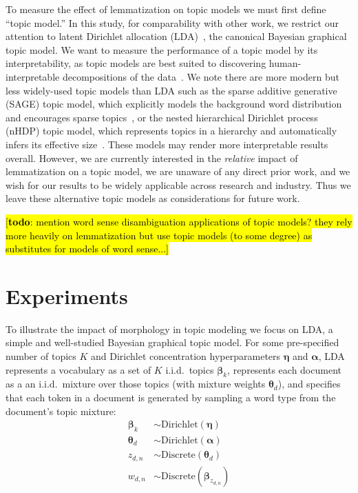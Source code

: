 \documentclass[11pt,letterpaper]{article}
\renewcommand{\vec}{\boldsymbol}   %
\newcommand{\valpha}{{\vec{\alpha}}}
\newcommand{\vtheta}{{\vec{\theta}}}
\newcommand{\veta}{{\vec{\eta}}}
\newcommand{\vbeta}{{\vec{\beta}}}
\newcommand{\Discrete}{\ensuremath{\mathrm{Discrete}}}
\newcommand{\Dirichlet}{\ensuremath{\mathrm{Dirichlet}}}
\newcommand{\Note}[3]{\sethlcolor{#2}\hl{[\textbf{#1}: #3]}}
\newcommand{\todo}[1]{\Note{todo}{lightred}{#1}}
\begin{document}
{To measure the effect of lemmatization on topic models we must first
define ``topic model.''  In this study, for comparability with other
work, we restrict our attention to latent Dirichlet allocation
(LDA)~\cite{blei2003}, the canonical Bayesian graphical topic model.
We want to measure the performance of a topic model by its
interpretability, as topic models are best suited to discovering
human-interpretable decompositions of the data~\cite{may2015}.
We note there are more modern but less widely-used topic models than
LDA such as the sparse additive generative
(SAGE) topic model, which explicitly models the background word
distribution and encourages sparse topics~\cite{eisenstein2011}, or the
nested hierarchical Dirichlet process (nHDP) topic model, which
represents topics in a hierarchy and automatically infers its effective
size~\cite{paisley2015}.  These models may render more interpretable
results overall.  However, we are currently interested in the
\emph{relative} impact of lemmatization on a topic model, we are
unaware of any direct prior work, and we wish for our results to be
widely applicable across research and industry.  Thus we leave these
alternative topic models as considerations for future work.

\todo{mention word sense disambiguation applications of topic models?
    they rely more heavily on lemmatization but use topic models (to
    some degree) as substitutes for models of word sense...}


\section{Experiments}\label{sec:experiments}

To illustrate the impact of morphology in topic modeling we focus on
LDA, a simple and well-studied Bayesian graphical topic model.
For some pre-specified
number of topics $K$ and Dirichlet concentration hyperparameters
$\veta$ and $\valpha$, LDA represents a vocabulary as a set of $K$
i.i.d.\ topics $\vbeta_k$, represents each document as a
an i.i.d.\ mixture over those topics (with mixture weights
$\vtheta_d$), and specifies that each token in a document is
generated by sampling a word type from the document's topic mixture:
\begin{align*}
    \vbeta_k  & \sim \Dirichlet\left(\veta\right) \\
    \vtheta_d & \sim \Dirichlet\left(\valpha\right) \\
    z_{d,n}              & \sim \Discrete\left(\vtheta_d\right) \\
    w_{d,n}              & \sim \Discrete\left(\vbeta_{z_{d,n}}\right)
\end{align*}

}
\end{document}
